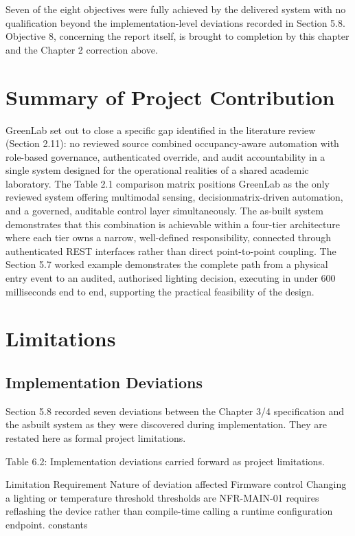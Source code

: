 Seven of the eight objectives were fully achieved by the delivered system with no
qualification beyond the implementation-level deviations recorded in Section 5.8.
Objective 8, concerning the report itself, is brought to completion by this chapter and the
Chapter 2 correction above.


\section{Summary of Project Contribution}


GreenLab set out to close a specific gap identified in the literature review (Section 2.11):
no reviewed source combined occupancy-aware automation with role-based governance,
authenticated override, and audit accountability in a single system designed for the
operational realities of a shared academic laboratory. The Table 2.1 comparison matrix
positions GreenLab as the only reviewed system offering multimodal sensing, decisionmatrix-driven automation, and a governed, auditable control layer simultaneously. The
as-built system demonstrates that this combination is achievable within a four-tier
architecture where each tier owns a narrow, well-defined responsibility, connected
through authenticated REST interfaces rather than direct point-to-point coupling. The
Section 5.7 worked example demonstrates the complete path from a physical entry event
to an audited, authorised lighting decision, executing in under 600 milliseconds end to
end, supporting the practical feasibility of the design.


\section{Limitations}


\subsection{Implementation Deviations}


Section 5.8 recorded seven deviations between the Chapter 3/4 specification and the asbuilt system as they were discovered during implementation. They are restated here as
formal project limitations.

Table 6.2: Implementation deviations carried forward as project limitations.




Limitation Requirement Nature of deviation
affected
Firmware control
Changing a lighting or temperature threshold
thresholds are
NFR-MAIN-01 requires reflashing the device rather than
compile-time
calling a runtime configuration endpoint.
constants

